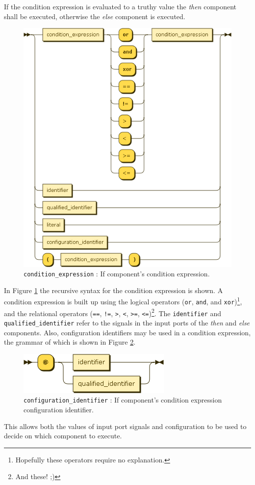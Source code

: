 If the condition expression is evaluated to a truthy value the \emph{then} component shall be executed, otherwise the \emph{else} component is executed.
\begin{figure}[h!]
  \centering
    \includegraphics[scale=\DiagramScale]{chapters/compiler/diagrams/condition_expression}
  \caption{\texttt{condition\_expression} : If component's condition expression.}
  \label{fig:pcl-cond-expr}
\end{figure}
In Figure \ref{fig:pcl-cond-expr} the recursive syntax for the condition expression is shown. A condition expression is built up using the logical operators (\texttt{or}, \texttt{and}, and \texttt{xor})\footnote{Hopefully these operators require no explanation.}, and the relational operators (\texttt{==}, \texttt{!=}, \texttt{>}, \texttt{<}, \texttt{>=}, \texttt{<=})\footnote{And these! ;)}. The \texttt{identifier} and \texttt{qualified\_identifier} refer to the signals in the input ports of the \emph{then} and \emph{else} components. Also, configuration identifiers may be used in a condition expression, the grammar of which is shown in Figure \ref{fig:pcl-config-id}.
\begin{figure}[h!]
  \centering
    \includegraphics[scale=\DiagramScale]{chapters/compiler/diagrams/configuration_identifier}
  \caption{\texttt{configuration\_identifier} : If component's condition expression configuration identifier.}
  \label{fig:pcl-config-id}
\end{figure}
This allows both the values of input port signals and configuration to be used to decide on which component to execute.


